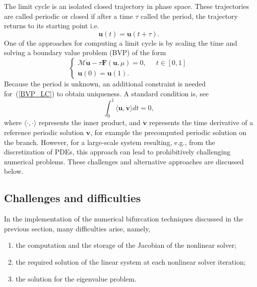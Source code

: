 The limit cycle is an isolated closed trajectory in phase space. These trajectories are called periodic or closed if after a time $\tau$ called the period, the trajectory returns to its starting point i.e.
\begin{equation}\label{limit_cycle}
\mathbf{u}(t) = \mathbf{u}(t+\tau).
\end{equation}
One of the approaches for computing a limit cycle is by scaling the time and solving a boundary value problem (BVP) of the form
\begin{equation}\begin{cases}\label{BVP_LC}
\mathcal{M}\mathbf{\dot{u}} - \tau\mathbf{F}(\mathbf{u},\mu) = 0, \;\;\;\;\; t \in[0,1]\\
\mathbf{u}(0) = \mathbf{u}(1).
\end{cases}\end{equation}
Because the period is unknown, an additional constraint is needed for~(\ref{BVP_LC}) to obtain uniqueness. A standard condition is, see~\cite{cond_periodic}
\begin{equation}\label{BVP_con}
\int_0^1 \langle\mathbf{u},\mathbf{\dot{v}}\rangle dt = 0,
\end{equation}
where $\langle\cdot,\cdot\rangle$ represents the inner product, and $\mathbf{\dot{v}}$ represents the time derivative of a reference periodic solution $\mathbf{v}$, for example the precomputed periodic solution on the branch.
However, for a large-scale system resulting, e.g., from the discretization of PDEs, this approach can lead to prohibitively  challenging numerical problems.
These challenges and alternative approaches are discussed below.

\subsection{Challenges and difficulties}\label{sc_cha_diff}
In the implementation of the numerical bifurcation techniques discussed in the previous section, many difficulties arise, namely,
\begin{enumerate}\itemsep=0pt
\item the computation and the storage of the Jacobian of the nonlinear solver;
\item the required solution of the linear system at each nonlinear solver iteration;
\item the solution for the eigenvalue problem.
\end{enumerate}

